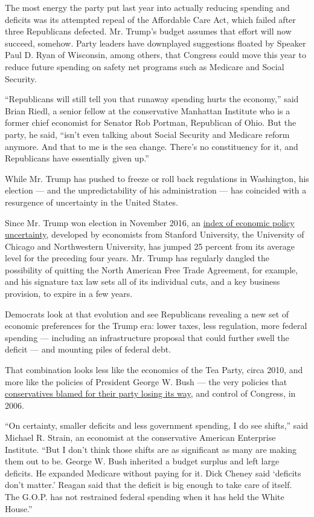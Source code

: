 The most energy the party put last year into actually reducing spending
and deficits was its attempted repeal of the Affordable Care Act, which
failed after three Republicans defected. Mr. Trump's budget assumes that
effort will now succeed, somehow. Party leaders have downplayed
suggestions floated by Speaker Paul D. Ryan of Wisconsin, among others,
that Congress could move this year to reduce future spending on safety
net programs such as Medicare and Social Security.

``Republicans will still tell you that runaway spending hurts the
economy,'' said Brian Riedl, a senior fellow at the conservative
Manhattan Institute who is a former chief economist for Senator Rob
Portman, Republican of Ohio. But the party, he said, ``isn't even
talking about Social Security and Medicare reform anymore. And that to
me is the sea change. There's no constituency for it, and Republicans
have essentially given up.''

While Mr. Trump has pushed to freeze or roll back regulations in
Washington, his election --- and the unpredictability of his
administration --- has coincided with a resurgence of uncertainty in the
United States.

Since Mr. Trump won election in November 2016, an
\href{http://www.policyuncertainty.com/us_monthly.html}{index of
economic policy uncertainty}, developed by economists from Stanford
University, the University of Chicago and Northwestern University, has
jumped 25 percent from its average level for the preceding four years.
Mr. Trump has regularly dangled the possibility of quitting the North
American Free Trade Agreement, for example, and his signature tax law
sets all of its individual cuts, and a key business provision, to expire
in a few years.

Democrats look at that evolution and see Republicans revealing a new set
of economic preferences for the Trump era: lower taxes, less regulation,
more federal spending --- including an infrastructure proposal that
could further swell the deficit --- and mounting piles of federal debt.

That combination looks less like the economics of the Tea Party, circa
2010, and more like the policies of President George W. Bush --- the
very policies that
\href{http://www.washingtonpost.com/wp-dyn/content/article/2006/05/10/AR2006051002040.html}{conservatives
blamed for their party losing its way}, and control of Congress, in
2006.

``On certainty, smaller deficits and less government spending, I do see
shifts,'' said Michael R. Strain, an economist at the conservative
American Enterprise Institute. ``But I don't think those shifts are as
significant as many are making them out to be. George W. Bush inherited
a budget surplus and left large deficits. He expanded Medicare without
paying for it. Dick Cheney said `deficits don't matter.' Reagan said
that the deficit is big enough to take care of itself. The G.O.P. has
not restrained federal spending when it has held the White House.''

